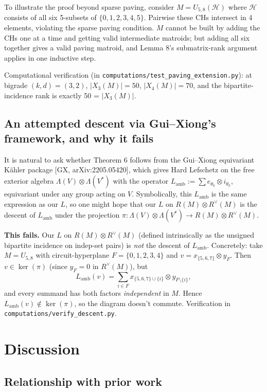 \documentclass[11pt]{article}
\theoremstyle{definition}
\newcommand{\dualR}{R^{\vee}}
\renewcommand{\H}{\mathcal{H}}
\begin{document}
To illustrate the proof beyond sparse paving, consider $M = U_{5, 8}(\H)$ where $\H$ consists of all six 5-subsets of $\{0, 1, 2, 3, 4, 5\}$. Pairwise these CHs intersect in 4 elements, violating the sparse paving condition. $M$ cannot be built by adding the CHs one at a time and getting valid intermediate matroids; but adding all six together gives a valid paving matroid, and Lemma 8's submatrix-rank argument applies in one inductive step.

Computational verification (in \texttt{computations/test\_paving\_extension.py}): at bigrade $(k, d) = (3, 2)$, $|X_3(M)| = 50$, $|X_4(M)| = 70$, and the bipartite-incidence rank is exactly 50 = $|X_3(M)|$.

\subsection{An attempted descent via Gui--Xiong's framework, and why it fails}

It is natural to ask whether Theorem 6 follows from the Gui--Xiong equivariant K\"ahler package [GX, arXiv:2205.05420], which gives Hard Lefschetz on the free exterior algebra $\Lambda(V) \otimes \Lambda(V^*)$ with the operator $L_{\mathrm{amb}} := \sum e_{\theta_k} \otimes i_{\theta_k}$, equivariant under any group acting on $V$. Symbolically, this $L_{\mathrm{amb}}$ is the same expression as our $L$, so one might hope that our $L$ on $R(M) \otimes \dualR(M)$ is the descent of $L_{\mathrm{amb}}$ under the projection $\pi: \Lambda(V) \otimes \Lambda(V^*) \to R(M) \otimes \dualR(M)$.

\textbf{This fails.} Our $L$ on $R(M) \otimes \dualR(M)$ (defined intrinsically as the unsigned bipartite incidence on indep-set pairs) is \emph{not} the descent of $L_{\mathrm{amb}}$. Concretely: take $M = U_{5,8}$ with circuit-hyperplane $F = \{0,1,2,3,4\}$ and $v = x_{\{5,6,7\}} \otimes y_F$. Then $v \in \ker(\pi)$ (since $y_F = 0$ in $\dualR(M)$), but
\[ L_{\mathrm{amb}}(v) = \sum_{i \in F} x_{\{5,6,7\} \cup \{i\}} \otimes y_{F \setminus \{i\}}, \]
and every summand has both factors \emph{independent} in $M$. Hence $L_{\mathrm{amb}}(v) \notin \ker(\pi)$, so the diagram doesn't commute. Verification in \texttt{computations/verify\_descent.py}.

\section{Discussion}

\subsection{Relationship with prior work}
\end{document}
